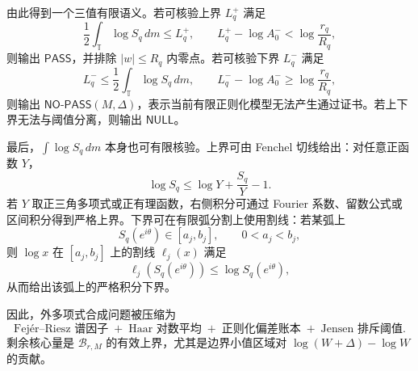 由此得到一个三值有限语义。若可核验上界 \(L_q^+\) 满足
\[
\frac12\int_{\mathbb T}\log S_q\,dm\le L_q^+,
\qquad
L_q^+-\log A_0^-<\log\frac{r_q}{R_q},
\]
则输出 \(\mathsf{PASS}\)，并排除 \(|w|\le R_q\) 内零点。若可核验下界 \(L_q^-\) 满足
\[
L_q^-\le\frac12\int_{\mathbb T}\log S_q\,dm,
\qquad
L_q^- -\log A_0^-\ge\log\frac{r_q}{R_q},
\]
则输出 \(\mathsf{NO\text{-}PASS}(M,\Delta)\)，表示当前有限正则化模型无法产生通过证书。若上下界无法与阈值分离，则输出 \(\mathsf{NULL}\)。

最后，\(\int\log S_q\,dm\) 本身也可有限核验。上界可由 Fenchel 切线给出：对任意正函数 \(Y\)，
\[
\log S_q
\le
\log Y+\frac{S_q}{Y}-1.
\]
若 \(Y\) 取正三角多项式或正有理函数，右侧积分可通过 Fourier 系数、留数公式或区间积分得到严格上界。下界可在有限弧分割上使用割线：若某弧上
\[
S_q(e^{i\theta})\in[a_j,b_j],
\qquad
0<a_j<b_j,
\]
则 \(\log x\) 在 \([a_j,b_j]\) 上的割线 \(\ell_j(x)\) 满足
\[
\ell_j(S_q(e^{i\theta}))\le\log S_q(e^{i\theta}),
\]
从而给出该弧上的严格积分下界。

因此，外多项式合成问题被压缩为
\[
\text{Fej\'er--Riesz 谱因子}
\;+\;
\text{Haar 对数平均}
\;+\;
\text{正则化偏差账本}
\;+\;
\text{Jensen 排斥阈值}.
\]
剩余核心量是 \(\mathcal B_{r,M}\) 的有效上界，尤其是边界小值区域对 \(\log(W+\Delta)-\log W\) 的贡献。
